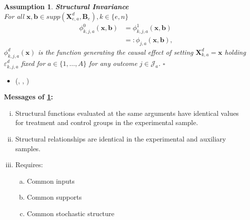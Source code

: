 \documentclass[static]{JJH-Beamer}
\newtheorem{assumption}{Assumption}
\begin{document}
\begin{frame}

\begin{assumption} \label{ass:summary} \textbf{Structural Invariance}\\
For all $\bm{x}, \bm{b} \in supp(\bm{X}^d_{e,a}, \bm{B}_e), k \in \{e,n\}$
\begin{align}
\phi_{k,j,a}^0 \left( \bm{x}, \bm{b} \right) &= \phi_{k,j,a}^1 (\bm{x}, \bm{b}) \\   \nonumber
                                                                     &=: \phi_{j,a} (\bm{x}, \bm{b}),
\end{align}
$\phi^d_{k,j,a}(\bm{x})$ is the function generating the causal effect of setting $\bm{X}^d_{k,a}=\bm{x}$ holding $\varepsilon^d_{k,j,a}$ fixed for $a \in \{1,\dots,A\}$ for any outcome $j \in \mathcal{J}_{a}$. $\square$
\end{assumption}

\begin{itemize}
\item (\citealp{Frisch_1938_autonomy}, \citealp{Marschak_1953_economic}, \citealp{Hurwicz_1962_structural})
\end{itemize}

\end{frame}

\begin{frame}

\begin{center}
\textbf{Messages of \ref{ass:summary}:}
\end{center}

\begin{enumerate}[(i)]
\item Structural functions evaluated at the same arguments have identical values for treatment and control groups in the experimental sample.
\item Structural relationships are identical in the experimental and auxiliary samples.
\item Requires:
\begin{enumerate}[(a)]
\item Common inputs
\item Common supports
\item Common stochastic structure
\end{enumerate}
\end{enumerate}

\end{frame}
\end{document}
